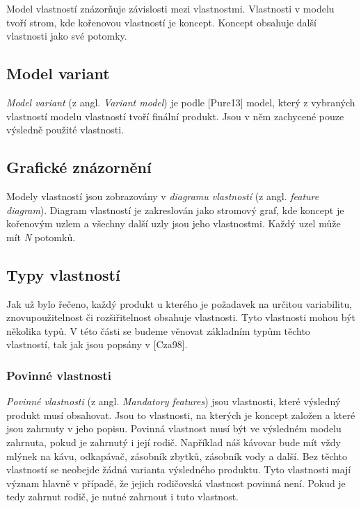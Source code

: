 Model vlastností znázorňuje závislosti mezi vlastnostmi. Vlastnosti v modelu tvoří strom, kde kořenovou vlastností je koncept. Koncept obsahuje další vlastnosti jako své potomky.

\subsection{Model variant}

\textit{Model variant} (z angl. \textit{Variant model}) je podle [Pure13] model, který z vybraných vlastností modelu vlastností tvoří finální produkt. Jsou v něm zachycené pouze výsledně použité vlastnosti. 

\subsection{Grafické znázornění}
Modely vlastností jsou zobrazovány v \textit{diagramu vlastností} (z angl. \textit{feature diagram}). Diagram vlastností je zakreslován jako stromový graf, kde koncept je kořenovým uzlem a všechny další uzly jsou jeho vlastnostmi. Každý uzel může mít \textit{N} potomků.

\subsection{Typy vlastností}

Jak už bylo řečeno, každý produkt u kterého je požadavek na určitou variabilitu, znovupoužitelnost či rozšiřitelnost obsahuje vlastnosti. Tyto vlastnosti mohou být několika typů. V této části se budeme věnovat základním typům těchto vlastností, tak jak jsou popsány v [Cza98].

\subsubsection{Povinné vlastnosti}
\textit{Povinné vlastnosti} (z angl. \textit{Mandatory features}) jsou vlastnosti, které výsledný produkt musí obsahovat. Jsou to vlastnosti, na kterých je koncept založen a které jsou zahrnuty v jeho popisu. Povinná vlastnost musí být ve výsledném modelu zahrnuta, pokud je zahrnutý i její rodič. Například náš kávovar bude mít vždy mlýnek na kávu, odkapávač, zásobník zbytků, zásobník vody a další. Bez těchto vlastností se neobejde žádná varianta výsledného produktu. Tyto vlastnosti mají význam hlavně v případě, že jejich rodičovská vlastnost povinná není. Pokud je tedy zahrnut rodič, je nutné zahrnout i tuto vlastnost.

